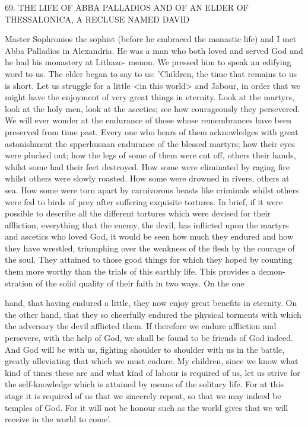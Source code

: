 69.
THE LIFE OF ABBA PALLADIOS AND OF AN
ELDER OF THESSALONICA,
A RECLUSE NAMED DAVID

Master Sophronios the sophist (before he embraced the monastic
life) and I met Abba Palladios in Alexandria.
He was a man who
both loved and served God and he had his monastery at Lithazo-
menon.
We pressed him to speak an edifying word to us.
The elder
began to say to us: 'Children, the time that remains to us is short.
Let us struggle for a little <in this world> and Jabour, in order that
we might have the enjoyment of very great things in eternity.
Look
at the martyrs, look at the holy men, look at the ascetics; see how
courageously they persevered.
We will ever wonder at the endurance
of those whose remembrances have been preserved from time past.
Every one who hears of them acknowledges with great astonishment
the spperhusnan endurance of the blessed martyrs; how their eyes
were plucked out; how the legs of some of them were cut off, others
their hands, whilst some had their feet destroyed.
How some were
eliminated by raging fire whilst others were slowly roasted.
How
some were drowned in rivers, others at sea.
How some were torn
apart by carnivorous beasts like criminals whilst others were fed to
birds of prey after suffering exquisite tortures.
In brief, if it were
possible to describe all the different tortures which were devised for
their affliction, everything that the enemy, the devil, has inflicted
upon the martyrs and ascetics who loved God, it would be seen how
much they endured and how they have wrestled, triumphing over
the weakness of the flesh by the courage of the soul.
They attained
to those good things for which they hoped by counting them more
worthy than the trials of this earthly life.
This provides a demon-
stration of the solid quality of their faith in two ways.
On the one

hand, that having endured a little, they now enjoy great benefits in
eternity.
On the other hand, that they so cheerfully endured the
physical torments with which the adversary the devil afflicted them.
If therefore we endure affliction and persevere, with the help of
God, we shall be found to be friends of God indeed.
And God will
be with us, fighting shoulder to shoulder with us in the battle,
greatly alleviating that which we must endure.
My children, since we
know what kind of times these are and what kind of labour is
required of us, let us strive for the self-knowledge which is attained
by means of the solitary life.
For at this stage it is required of us
that we sincerely repent, so that we may indeed be temples of God.
For it will not be honour such as the world gives that we will
receive in the world to come'.

